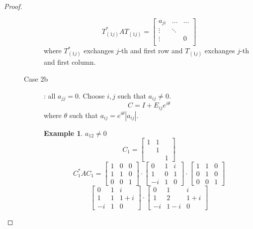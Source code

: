 \documentclass{article}
\newtheorem{example}{Example}  \numberwithin{example}{section}
\newcommand{\card}[1]{\left|#1\right|}
\begin{document}
\begin{proof}
\begin{description}
\begin{description}
          \[
            T_{(1j)}^* A T_{(1j)} =
            \begin{bmatrix}
              a_{ji}  & \ldots & \ldots \\
              \vdots  & \ddots &   \\
              \vdots  &        & 0 \\
            \end{bmatrix}
          \]
          where $T_{(1j)}^*$ exchanges $j$-th and first row
          and $T_{(1j)}$ exchanges $j$-th and first column.
        \item[Case 2b]:
          all $a_{jj} = 0$. Choose $i,j$ such that $a_{ij} \neq 0$.
          \[ C = I + E_{ij} e^{i\theta} \]
          where $\theta$ such that $a_{ij} = e^{i\theta} \card{a_{ij}}$.

          \begin{example}
            $a_{12} \neq 0$
            \[
              C_1 = \begin{bmatrix}
                1 & 1 & \\
                  & 1 & \\
                  &   & 1
              \end{bmatrix}
            \] \[
              C_1^* A C_1 = \begin{bmatrix}
                1 & 0 & 0 \\
                1 & 1 & 0 \\
                0 & 0 & 1
              \end{bmatrix} \cdot \begin{bmatrix} 
                0 & 1 & i \\
                1 & 0 & 1 \\
                -i & 1 & 0
              \end{bmatrix} \cdot \begin{bmatrix}
                1 & 1 & 0 \\
                0 & 1 & 0 \\
                0 & 0 & 1
              \end{bmatrix}
            \] \[
              \begin{bmatrix}
                0 & 1 & i \\
                1 & 1 & 1+i \\
                -i & 1 & 0
              \end{bmatrix} \cdot \begin{bmatrix}
                0 & 1 & i \\
                1 & 2 & 1+i \\
                -i & 1-i & 0
              \end{bmatrix}
            \]
          \end{example}


\end{description}
\end{description}
\end{proof}
\end{document}
